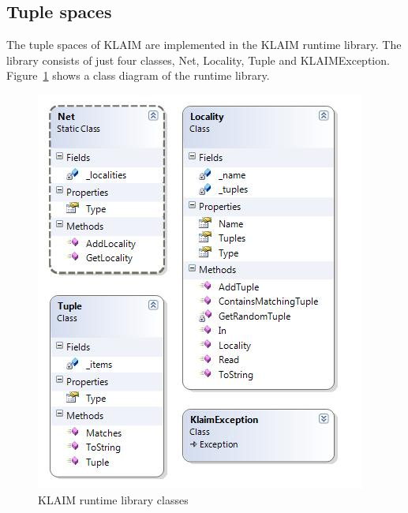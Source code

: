 \subsection{Tuple spaces}

	The tuple spaces of KLAIM are implemented in the KLAIM runtime library. The 
	library consists of just four classes, \textsf{Net}, \textsf{Locality}, 
	\textsf{Tuple} and \textsf{KLAIMException}. Figure~\ref{fig:klaim_runtime} 
	shows a class diagram of the runtime library.

	\begin{figure}[h!]
		\centering
		\includegraphics[scale=0.8]{klaim_runtime.jpg}
		\caption{KLAIM runtime library classes}
		\label{fig:klaim_runtime}
	\end{figure}
	
